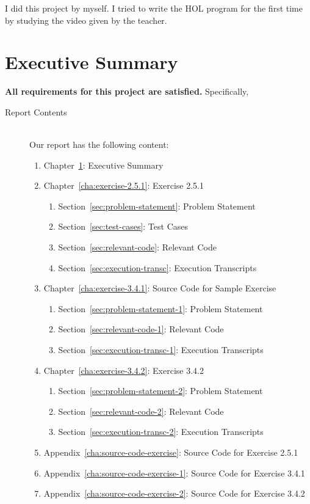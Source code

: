 \documentclass{report}
\begin{document}
\begin{acknowledgments}
  I did this project by myself. I tried to write the HOL program for the first time by studying the video given by the teacher.
\end{acknowledgments}

\tableofcontents{}

\chapter{Executive Summary}
\label{cha:executive-summary}

\textbf{All requirements for this project are satisfied.}
Specifically,
\begin{description}
\item[Report Contents] \ \\
  Our report has the following content:
  \begin{enumerate}[{}]
  \item Chapter~\ref{cha:executive-summary}: Executive Summary
  \item Chapter~\ref{cha:exercise-2.5.1}: Exercise 2.5.1
    \begin{enumerate}[{}]
    \item Section~\ref{sec:problem-statement}: Problem Statement
    \item Section~\ref{sec:test-cases}: Test Cases
    \item Section~\ref{sec:relevant-code}: Relevant Code
    \item Section~\ref{sec:execution-transc}: Execution Transcripts
    \end{enumerate}
  \item Chapter~\ref{cha:exercise-3.4.1}: Source Code for Sample Exercise
    \begin{enumerate}[{}]
    \item Section~\ref{sec:problem-statement-1}: Problem Statement
    \item Section~\ref{sec:relevant-code-1}: Relevant Code
    \item Section~\ref{sec:execution-transc-1}: Execution Transcripts
    \end{enumerate}
  \item Chapter~\ref{cha:exercise-3.4.2}: Exercise 3.4.2
    \begin{enumerate}[{}]
    \item Section~\ref{sec:problem-statement-2}: Problem Statement
    \item Section~\ref{sec:relevant-code-2}: Relevant Code
    \item Section~\ref{sec:execution-transc-2}: Execution Transcripts
    \end{enumerate}
  \item Appendix~\ref{cha:source-code-exercise}: Source Code for
    Exercise 2.5.1
  \item Appendix~\ref{cha:source-code-exercise-1}: Source Code for
    Exercise 3.4.1
  \item Appendix~\ref{cha:source-code-exercise-2}: Source Code for
    Exercise 3.4.2
  \end{enumerate}


\end{description}
\end{document}

